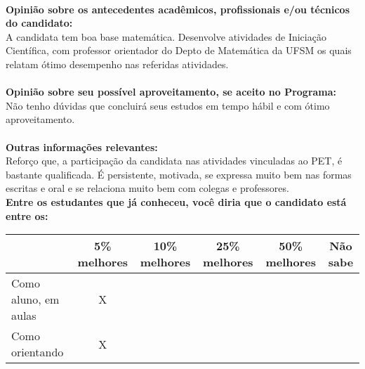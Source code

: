 \documentclass[11pt]{article}
\begin{document}
\\
\textbf{Opinião sobre os antecedentes acadêmicos, profissionais e/ou técnicos do candidato:}
\\A candidata tem boa base matemática. Desenvolve atividades de Iniciação Científica, com professor orientador do Depto de Matemática da UFSM os quais relatam ótimo desempenho nas referidas atividades.\\
\\
\textbf{Opinião sobre seu possível aproveitamento, se aceito no Programa:}
\\Não tenho dúvidas que concluirá seus estudos em tempo hábil e com ótimo aproveitamento.\\ 
\\
\textbf{Outras informações relevantes:} \\Reforço que, a participação da candidata nas atividades vinculadas ao PET, é bastante qualificada. É persistente, motivada, se expressa muito bem nas formas escritas e oral e se relaciona muito bem com colegas e professores.
\\[0.3cm]
\textbf{Entre os estudantes que já conheceu, você diria que o candidato está entre os:}
\\
\begin{tabular}{|l|c|c|c|c|c|}
\hline
 & 5\% melhores & 10\% melhores & 25\% melhores & 50\% melhores & Não sabe \\
\hline
Como aluno, em aulas & X &  &  &  & \\
\hline
Como orientando & X &  &  &  & \\
\hline
\end{tabular}
\end{document}
